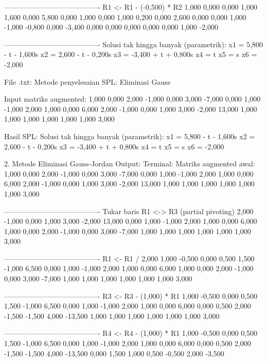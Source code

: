 \documentclass[12pt]{article}
\begin{document}
\begin{enumerate}
\begin{keluaran}
----------------------------------------
R1 <- R1 - (-0,500) * R2
1,000   0,000   0,000   1,000   1,600   0,000   5,800
0,000   1,000   0,000   1,000   0,200   0,000   2,600
0,000   0,000   1,000   -1,000  -0,800  0,000   -3,400
0,000   0,000   0,000   0,000   0,000   1,000   -2,000

----------------------------------------
Solusi tak hingga banyak (parametrik):
x1 = 5,800 - t - 1,600s
x2 = 2,600 - t - 0,200s
x3 = -3,400 + t + 0,800s
x4 = t
x5 = s
x6 = -2,000

File .txt:
Metode penyelesaian SPL: Eliminasi Gauss

Input matriks augmented:
1,000	0,000	2,000	-1,000	0,000	3,000	-7,000
0,000	1,000	-1,000	2,000	1,000	0,000	6,000
2,000	-1,000	0,000	1,000	3,000	-2,000	13,000
1,000	1,000	1,000	1,000	1,000	1,000	3,000

Hasil SPL:
Solusi tak hingga banyak (parametrik):
x1 = 5,800 - t - 1,600s
x2 = 2,600 - t - 0,200s
x3 = -3,400 + t + 0,800s
x4 = t
x5 = s
x6 = -2,000

2. Metode Eliminasi Gauss-Jordan
Output:
Terminal:
Matriks augmented awal:
1,000   0,000   2,000   -1,000  0,000   3,000   -7,000
0,000   1,000   -1,000  2,000   1,000   0,000   6,000
2,000   -1,000  0,000   1,000   3,000   -2,000  13,000
1,000   1,000   1,000   1,000   1,000   1,000   3,000

----------------------------------------
Tukar baris R1 <-> R3 (partial pivoting)
2,000   -1,000  0,000   1,000   3,000   -2,000  13,000
0,000   1,000   -1,000  2,000   1,000   0,000   6,000
1,000   0,000   2,000   -1,000  0,000   3,000   -7,000
1,000   1,000   1,000   1,000   1,000   1,000   3,000

----------------------------------------
R1 <- R1 / 2,000
1,000   -0,500  0,000   0,500   1,500   -1,000  6,500
0,000   1,000   -1,000  2,000   1,000   0,000   6,000
1,000   0,000   2,000   -1,000  0,000   3,000   -7,000
1,000   1,000   1,000   1,000   1,000   1,000   3,000

----------------------------------------
R3 <- R3 - (1,000) * R1
1,000   -0,500  0,000   0,500   1,500   -1,000  6,500
0,000   1,000   -1,000  2,000   1,000   0,000   6,000
0,000   0,500   2,000   -1,500  -1,500  4,000   -13,500
1,000   1,000   1,000   1,000   1,000   1,000   3,000

----------------------------------------
R4 <- R4 - (1,000) * R1
1,000   -0,500  0,000   0,500   1,500   -1,000  6,500
0,000   1,000   -1,000  2,000   1,000   0,000   6,000
0,000   0,500   2,000   -1,500  -1,500  4,000   -13,500
0,000   1,500   1,000   0,500   -0,500  2,000   -3,500


\end{keluaran}
\end{enumerate}
\end{document}
